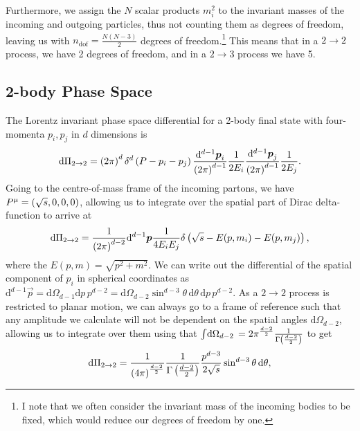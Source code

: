     Furthermore, we assign the \(N\) scalar products \(m^2_i\) to the invariant masses of the incoming and outgoing particles, thus not counting them as degrees of freedom, leaving us with
    \(n_\text{dof} = \frac{N(N-3)}{2}\) degrees of freedom.\footnote{I note that we often consider the invariant mass of the incoming bodies to be fixed, which would reduce our degrees of freedom by one.}
    This means that in a \(2\to 2\) process, we have 2 degrees of freedom, and in a \(2\to 3\) process we have 5.


    \subsection{2-body Phase Space}
        The Lorentz invariant phase space differential for a 2-body final state with four-momenta \(p_i, p_j\) in \(d\) dimensions is
        \begin{equation}
            \mathrm{d}\Pi_{2\to 2} = \left(2\pi\right)^d \delta^d\left(P - p_i - p_j\right) \frac{\mathrm{d}^{d-1} \boldsymbol{p}_i}{\left(2\pi\right)^{d-1}} \frac{1}{2E_i} \frac{\mathrm{d}^{d-1} \boldsymbol{p}_j}{\left(2\pi\right)^{d-1}} \frac{1}{2E_j}.
        \end{equation}
        Going to the centre-of-mass frame of the incoming partons, we have \(P\^\mu = \pclosed{\sqrt{s}, 0, 0, 0}\), allowing us to integrate over the spatial part of Dirac delta-function to arrive at
        \begin{equation}
            \mathrm{d}\Pi_{2\to 2} = \frac{1}{\left(2\pi\right)^{d-2}} \mathrm{d}^{d-1} \boldsymbol{p} \frac{1}{4E_i E_j} \delta\left(\sqrt{s} - E(p, m_i) - E(p, m_j)\right),
        \end{equation}
        where the \(E(p, m) = \sqrt{p^2 + m^2}\).
        We can write out the differential of the spatial component of \(p_i\) in spherical coordinates as \(\mathrm{d}^{d-1} \vec{p} = \mathrm{d}\Omega_{d-1} \mathrm{d}p \, p^{d-2} = \mathrm{d}\Omega_{d-2} \sin^{d-3}\theta \, \mathrm{d}\theta \, \mathrm{d}p \, p^{d-2}\).
        As a \(2\to 2\) process is restricted to planar motion, we can always go to a frame of reference such that any amplitude we calculate will not be dependent on the spatial angles \(\mathrm{d} \Omega_{d-2}\), allowing us to integrate over them using that \(\int \!\mathrm{d}\Omega_{d-2}\, = 2 \pi^{\frac{d-2}{2}} \frac{1}{\Gamma\left(\frac{d-2}{2}\right)}\) to get
        \begin{equation}
            \mathrm{d}\Pi_{2\to 2} = \frac{1}{\left(4\pi\right)^{\frac{d-2}{2}}} \frac{1}{\Gamma\left(\frac{d-2}{2}\right)} \frac{p^{d-3}}{2 \sqrt{s}} \sin^{d-3}\theta \,\mathrm{d}\theta,
        \end{equation}
